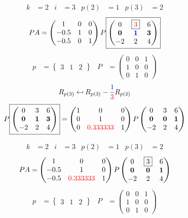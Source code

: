 \documentclass[pdf]{beamer}
\begin{document}
\begin{frame}{}\begin{align*} k &= 2 & i &= 3 & p(2) &= 1 & p(3) &= 2\end{align*} $$PA=\begin{pmatrix}1&0&0\\-0.5&1&0\\-0.5&0&1\end{pmatrix} P \boxed{\begin{pmatrix}0&\boxed{{\color{red}3}}&6\\\mathbf{0}&\mathbf{{\color{blue}1}}&\mathbf{3}\\-2&2&4\end{pmatrix}} $$ \begin{align*} p&= \begin{Bmatrix}3&1&2\end{Bmatrix} & P&= \begin{pmatrix}0&0&1\\1&0&0\\0&1&0\end{pmatrix} \end{align*} $$R_{p(3)} \mapsfrom R_{p(3)} - \frac{{\color{blue}1}}{{\color{red}3}} R_{p(2)}$$ $$ P \boxed{\begin{pmatrix}0&3&6\\\mathbf{0}&\mathbf{1}&\mathbf{3}\\-2&2&4\end{pmatrix}} = \begin{pmatrix}1&0&0\\0&1&0\\0&{\color{red}0.333333}&1\end{pmatrix} P \begin{pmatrix}0&3&6\\\mathbf{0}&\mathbf{0}&\mathbf{1}\\-2&2&4\end{pmatrix} $$\end{frame}
\begin{frame}{}\begin{align*} k &= 2 & i &= 3 & p(2) &= 1 & p(3) &= 2\end{align*}$$PA=\begin{pmatrix}1&0&0\\-0.5&1&0\\-0.5&{\color{red}0.333333}&1\end{pmatrix} P \begin{pmatrix}0&\boxed{3}&6\\\mathbf{0}&\mathbf{0}&\mathbf{1}\\-2&2&4\end{pmatrix} $$\begin{align*} p&= \begin{Bmatrix}3&1&2\end{Bmatrix} & P&= \begin{pmatrix}0&0&1\\1&0&0\\0&1&0\end{pmatrix} \end{align*}\end{frame}
\end{document}
